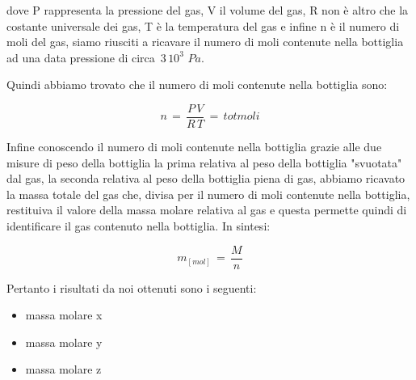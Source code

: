 dove P rappresenta la pressione del gas, V il volume del gas, R non è altro che la costante universale dei gas, T è la temperatura del gas e infine n è il numero di moli del gas, siamo riusciti a ricavare il numero di moli contenute nella bottiglia ad una data pressione di circa $\,3\,10^3\,\,Pa$.

Quindi abbiamo trovato che il numero di moli contenute nella bottiglia sono:

\begin{equation}
	n \,=\, \frac{P\,V}{R\,T} \,=\, tot moli
\end{equation}

Infine conoscendo il numero di moli contenute nella bottiglia grazie alle due misure di peso della bottiglia la prima relativa al peso della bottiglia "svuotata" dal gas, la seconda relativa al peso della bottiglia piena di gas, abbiamo ricavato la massa totale del gas che, divisa per il numero di moli contenute nella bottiglia, restituiva il valore della massa molare relativa al gas e questa permette quindi di identificare il gas contenuto nella bottiglia. In sintesi:

\begin{equation}
	m_[mol] \,=\, \frac{M}{n}
\end{equation}

Pertanto i risultati da noi ottenuti sono i seguenti:

\begin{itemize}
	\item{massa molare x}
	\item{massa molare y}
	\item{massa molare z}
\end{itemize}

